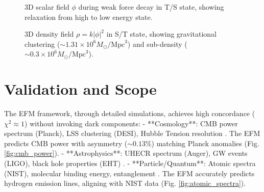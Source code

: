 \documentclass[11pt]{article}
\begin{document}
\begin{figure}[htbp]
\centering
{}
\caption{3D scalar field \(\phi\) during weak force decay in T/S state, showing relaxation from high to low energy state.}
\label{fig:weak_decay}
\end{figure}

\begin{figure}[htbp]
\centering
{}
\caption{3D density field \(\rho = k |\phi|^2\) in S/T state, showing gravitational clustering (\(\sim 1.31 \times 10^6 M_\odot / \text{Mpc}^3\)) and sub-density (\(\sim 0.3 \times 10^6 M_\odot / \text{Mpc}^3\)).}
\label{fig:gravity_density}
\end{figure}

\section{Validation and Scope}
The EFM framework, through detailed simulations, achieves high concordance (\(\chi^2 \approx 1\)) without invoking dark components:
- **Cosmology**: CMB power spectrum (Planck), LSS clustering (DESI), Hubble Tension resolution \citep{emvula2025cosmology,emvula2025expansion}. The EFM predicts CMB power with asymmetry (\(\sim 0.13\%\)) matching Planck anomalies (Fig. \ref{fig:cmb_power}).
- **Astrophysics**: UHECR spectrum (Auger), GW events (LIGO), black hole properties (EHT) \citep{emvula2025uhecr,emvula2025blackholes,emvula2025gw}.
- **Particle/Quantum**: Atomic spectra (NIST), molecular binding energy, entanglement \citep{emvula2025atomic,emvula2025quantum}. The EFM accurately predicts hydrogen emission lines, aligning with NIST data (Fig. \ref{fig:atomic_spectra}).
\end{document}
